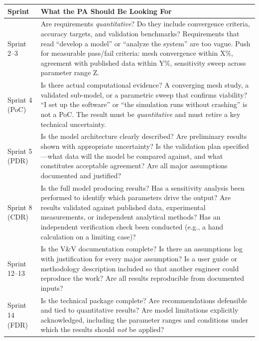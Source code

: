 \begin{center}
\small
\begin{tabularx}{\textwidth}{>{\raggedright\arraybackslash}p{2.2cm} X}
\toprule
\textbf{Sprint} & \textbf{What the PA Should Be Looking For} \\
\midrule
Sprint 2--3 &
Are requirements \emph{quantitative}? Do they include convergence criteria, accuracy targets, and validation benchmarks? Requirements that read ``develop a model'' or ``analyze the system'' are too vague. Push for measurable pass/fail criteria: mesh convergence within X\%, agreement with published data within Y\%, sensitivity sweep across parameter range Z. \\
\midrule
Sprint 4 (PoC) &
Is there actual computational evidence? A converging mesh study, a validated sub-model, or a parametric sweep that confirms viability? ``I set up the software'' or ``the simulation runs without crashing'' is not a PoC. The result must be \emph{quantitative} and must retire a key technical uncertainty. \\
\midrule
Sprint 5 (PDR) &
Is the model architecture clearly described? Are preliminary results shown with appropriate uncertainty? Is the validation plan specified---what data will the model be compared against, and what constitutes acceptable agreement? Are all major assumptions documented and justified? \\
\midrule
Sprint 8 (CDR) &
Is the full model producing results? Has a sensitivity analysis been performed to identify which parameters drive the output? Are results validated against published data, experimental measurements, or independent analytical methods? Has an independent verification check been conducted (e.g., a hand calculation on a limiting case)? \\
\midrule
Sprint 12--13 &
Is the V\&V documentation complete? Is there an assumptions log with justification for every major assumption? Is a user guide or methodology description included so that another engineer could reproduce the work? Are all results reproducible from documented inputs? \\
\midrule
Sprint 14 (FDR) &
Is the technical package complete? Are recommendations defensible and tied to quantitative results? Are model limitations explicitly acknowledged, including the parameter ranges and conditions under which the results should \emph{not} be applied? \\
\bottomrule
\end{tabularx}
\end{center}

